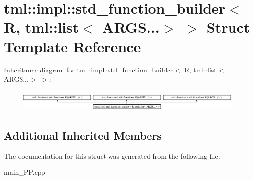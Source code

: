 \hypertarget{structtml_1_1impl_1_1std__function__builder_3_01R_00_01tml_1_1list_3_01ARGS_8_8_8_4_01_4}{\section{tml\+:\+:impl\+:\+:std\+\_\+function\+\_\+builder$<$ R, tml\+:\+:list$<$ A\+R\+G\+S...$>$ $>$ Struct Template Reference}
\label{structtml_1_1impl_1_1std__function__builder_3_01R_00_01tml_1_1list_3_01ARGS_8_8_8_4_01_4}
}
Inheritance diagram for tml\+:\+:impl\+:\+:std\+\_\+function\+\_\+builder$<$ R, tml\+:\+:list$<$ A\+R\+G\+S...$>$ $>$\+:\begin{figure}[H]
\begin{center}
\leavevmode
\includegraphics[height=1.148718cm]{structtml_1_1impl_1_1std__function__builder_3_01R_00_01tml_1_1list_3_01ARGS_8_8_8_4_01_4}
\end{center}
\end{figure}
\subsection*{Additional Inherited Members}


The documentation for this struct was generated from the following file\+:\begin{DoxyCompactItemize}
\item 
main\+\_\+\+P\+P.\+cpp\end{DoxyCompactItemize}
